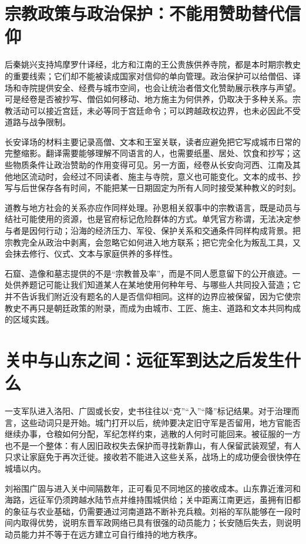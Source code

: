 \section{宗教政策与政治保护：不能用赞助替代信仰}
\label{sec:eastern-jin-depth-religion-politics}

后秦姚兴支持鸠摩罗什译经，北方和江南的王公贵族供养寺院，都是本时期宗教史的重要线索；它们却不能被读成国家对信仰的单向管理。政治保护可以给僧侣、译场和寺院提供安全、经费与城市空间，也会让统治者借文化赞助展示秩序与声望。可是经卷是否被抄写、僧侣如何移动、地方施主为何供养，仍取决于多种关系。宗教活动可以接近宫廷，未必等同于宫廷命令；可以跨越政权边界，也未必因此不受道路与战争限制。

长安译场的材料主要记录高僧、文本和王室关联，读者应避免把它写成城市日常的完整缩影。翻译需要能够理解不同语言的人，也需要纸墨、居处、饮食和抄写；这些物质条件让政治赞助的作用变得可见。另一方面，经卷从长安向河西、江南及其他地区流动时，会经过不同读者、施主与寺院，意义也可能变化。文本的成书、抄写与后世保存各有时间，不能把某一日期固定为所有人同时接受某种教义的时刻。

道教与地方社会的关系亦应作同样处理。孙恩相关叙事中的宗教语言，既是动员与结社可能使用的资源，也是官府标记危险群体的方式。单凭官方称谓，无法决定参与者是因何行动；沿海的经济压力、军役、保护关系和交通条件同样构成背景。把宗教完全从政治中剥离，会忽略它如何进入地方联系；把它完全化为叛乱工具，又会抹去修行、仪式、文本与家庭供养的多样性。

石窟、造像和墓志提供的不是“宗教普及率”，而是不同人愿意留下的公开痕迹。一处供养题记可能让我们知道某人在某地使用何种年号、与哪些人共同投入营造；它并不告诉我们附近没有题名的人是否信仰相同。这样的边界应被保留，因为它使宗教史不再只是朝廷政策的附录，而成为由城市、工匠、施主、道路和文本共同构成的区域实践。

\section{关中与山东之间：远征军到达之后发生什么}
\label{sec:eastern-jin-depth-occupation}

一支军队进入洛阳、广固或长安，史书往往以“克”“入”“降”标记结果。对于治理而言，这些动词只是开始。城门打开以后，统帅要决定旧守军是否留用，地方官能否继续办事，仓粮如何分配，军纪怎样约束，逃散的人何时可能回来。被征服的一方也不是一个整体：有人因旧政权失去保护而寻找新靠山，有人保留武装观望，有人只求让家庭免于再次迁徙。接收若不能进入这些关系，战场上的成功便会很快停在城墙以内。

刘裕围广固与进入关中间隔数年，正可看见不同地区的接收成本。山东靠近淮河和海路，远征军仍须跨越水陆节点并维持围城供给；关中距离江南更远，虽拥有旧都的象征与农业基础，仍需要通过河南道路不断补充兵粮。刘裕的军队能够在一段时间内取得优势，说明东晋军政网络已具有很强的动员能力；长安随后失去，则说明动员能力并不等于在远方建立可自行维持的地方秩序。

